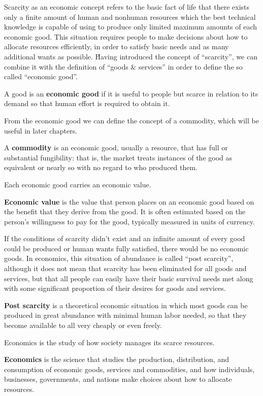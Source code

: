 Scarcity as an economic concept refers to the basic fact of life that there exists only a finite amount of human and
nonhuman resources which the best technical knowledge is capable of using to produce only limited maximum amounts of
each economic good. This situation requires people to make decisions about how to allocate resources efficiently, in
order to satisfy basic needs and as many additional wants as possible. \v

Having introduced the concept of ``scarcity'', we can combine it with the definition of ``goods \& services'' in
order to define the so called ``economic good''.

A good is an \textbf{economic good} if it is useful to people but scarce in relation to its demand so that human effort
is required to obtain it.
\ed

From the economic good we can define the concept of a commodity, which will be useful in later chapters.

\bd[Commodity]
A \textbf{commodity} is an economic good, usually a resource, that has full or substantial fungibility: that is, the
market treats instances of the good as equivalent or nearly so with no regard to who produced them.
\ed

Each economic good carries an economic value.

\textbf{Economic value} is the value that person places on an economic good based on the benefit that they derive
from the good. It is often estimated based on the person's willingness to pay for the good, typically measured in
units of currency.
\ed

If the conditions of scarcity didn't exist and an infinite amount of every good could be produced or human wants
fully satisfied, there would be no economic goods. In economics, this situation of abundance is called ``post
scarcity'', although it does not mean that scarcity has been eliminated for all goods and services, but that all
people can easily have their basic survival needs met along with some significant proportion of their desires for
goods and services.

\textbf{Post scarcity} is a theoretical economic situation in which most goods can be produced in great abundance
with minimal human labor needed, so that they become available to all very cheaply or even freely.
\ed

Economics is the study of how society manages its scarce resources.

\bd[Economics]
\textbf{Economics} is the science that studies the production, distribution, and consumption of economic goods,
services and commodities, and how individuals, businesses, governments, and nations make choices about how to
allocate resources.
\ed


